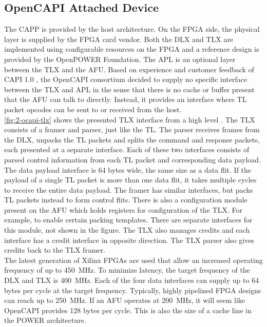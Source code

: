 \subsection{OpenCAPI Attached Device}
\label{sec:cacheline}
The CAPP is provided by the host architecture. On the FPGA side, the physical layer is supplied by the FPGA card vendor. Both the DLX and TLX are implemented using configurable resources on the FPGA and a reference design is provided by the OpenPOWER Foundation. The APL is an optional layer between the TLX and the AFU. Based on experience and customer feedback of CAPI 1.0 \cite{curt}, the OpenCAPI consortium decided to supply no specific interface between the TLX and APL in the sense that there is no cache or buffer present that the AFU can talk to directly. Instead, it provides an interface where TL packet opcodes can be sent to or received from the host.\\
\autoref{fig:2-ocapi-tlx} shows the presented TLX interface from a high level \cite{curt}. The TLX consists of a framer and parser, just like the TL. The parser receives frames from the DLX, unpacks the TL packets and splits the command and response packets, each presented at a separate interface. Each of these two interfaces consists of parsed control information from each TL packet and corresponding data payload. The data payload interface is 64 bytes wide, the same size as a data flit. If the payload of a single TL packet is more than one data flit, it takes multiple cycles to receive the entire data payload. The framer has similar interfaces, but packs TL packets instead to form control flits. There is also a configuration module present on the AFU which holds registers for configuration of the TLX. For example, to enable certain packing templates. There are separate interfaces for this module, not shown in the figure. The TLX also manages credits and each interface has a credit interface in opposite direction. The TLX parser also gives credits back to the TLX framer.\\
The latest generation of Xilinx FPGAs are used that allow an increased operating frequency of up to \SI{450}{\mega\hertz}. To minimize latency, the target frequency of the DLX and TLX is \SI{400}{\mega\hertz}. Each of the four data interfaces can supply up to 64 bytes per cycle at the target frequency. Typically, highly pipelined FPGA designs can reach up to \SI{250}{\mega\hertz}. If an AFU operates at \SI{200}{\mega\hertz}, it will seem like OpenCAPI provides 128 bytes per cycle. This is also the size of a cache line in the POWER architecture.

